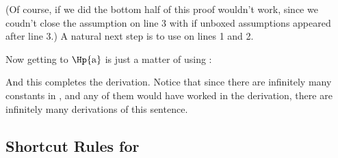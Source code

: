 (Of course, if we did the bottom half of this proof wouldn't work, since we coudn't close the assumption on line 3 with  if unboxed assumptions appeared after line 3.)
A natural next step is to use  on lines 1 and 2.
\begin{gproof}[\label{GQDExampleP}]
\end{gproof}
Now getting to $\Hp{\constant{a}}$ is just a matter of using :
\begin{gproof}[\label{GQDExampleQ}]
\end{gproof}
And this completes the derivation. Notice that since there are infinitely many constants in \GQL{}, and any of them would have worked in the derivation, there are infinitely many derivations of this
sentence.

\subsection{Shortcut Rules for \GQD{}}

